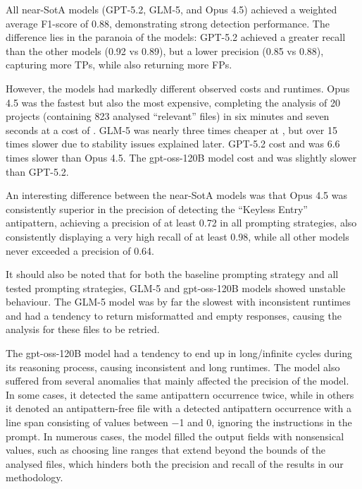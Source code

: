 All near-SotA models (GPT-5.2, GLM-5, and Opus 4.5) achieved a weighted average F1-score of \num{0.88}, demonstrating strong detection performance. The difference lies in the paranoia of the models: GPT-5.2 achieved a greater recall than the other models (\num{0.92} vs \num{0.89}), but a lower precision (\num{0.85} vs \num{0.88}), capturing more TPs, while also returning more FPs.

However, the models had markedly different observed costs and runtimes. Opus 4.5 was the fastest but also the most expensive, completing the analysis of \num{20} projects (containing \num{823} analysed “relevant” files) in six minutes and seven seconds at a cost of . GLM-5 was nearly three times cheaper at , but over \num{15} times slower due to stability issues explained later. GPT-5.2 cost  and was \num{6.6} times slower than Opus 4.5. The gpt-oss-120B model cost  and was slightly slower than GPT-5.2.

An interesting difference between the near-SotA models was that Opus 4.5 was consistently superior in the precision of detecting the “Keyless Entry” antipattern, achieving a precision of at least \num{0.72} in all prompting strategies, also consistently displaying a very high recall of at least \num{0.98}, while all other models never exceeded a precision of \num{0.64}.

It should also be noted that for both the baseline prompting strategy and all tested prompting strategies, GLM-5 and gpt-oss-120B models showed unstable behaviour. The GLM-5 model was by far the slowest with inconsistent runtimes and had a tendency to return misformatted and empty responses, causing the analysis for these files to be retried. 

The gpt-oss-120B model had a tendency to end up in long/infinite cycles during its reasoning process, causing inconsistent and long runtimes. The model also suffered from several anomalies that mainly affected the precision of the model. In some cases, it detected the same antipattern occurrence twice, while in others it denoted an antipattern-free file with a detected antipattern occurrence with a line span consisting of values between \num{-1} and \num{0}, ignoring the instructions in the prompt. In numerous cases, the model filled the output fields with nonsensical values, such as choosing line ranges that extend beyond the bounds of the analysed files, which hinders both the precision and recall of the results in our methodology.


